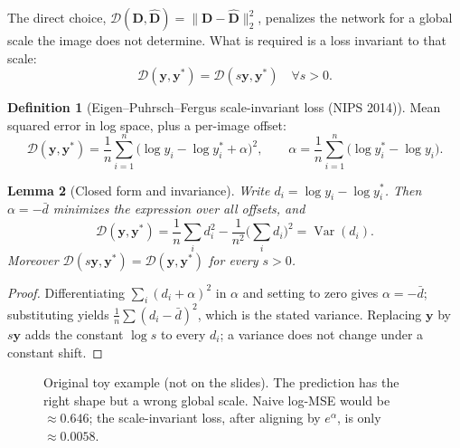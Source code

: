\documentclass[11pt,a4paper]{article}
\theoremstyle{definition}
\newtheorem{definition}{Definition}[section]
\theoremstyle{plain}
\newtheorem{lemma}[definition]{Lemma}
\theoremstyle{remark}
\begin{document}
The direct choice, $\mathcal D(\bm D,\hat{\bm D})=\|\bm D-\hat{\bm D}\|_2^2$, penalizes the network for a global scale the image does not determine. What is required is a loss invariant to that scale:
\[
\mathcal D(\bm y,\bm y^\ast)=\mathcal D(s\bm y,\bm y^\ast)\quad\forall s>0 .
\]
 
\begin{definition}[Eigen--Puhrsch--Fergus scale-invariant loss (NIPS 2014)]
Mean squared error in log space, plus a per-image offset:
\[
\mathcal D(\bm y,\bm y^\ast)=\frac1n\sum_{i=1}^n\big(\log y_i-\log y^\ast_i+\alpha\big)^2,
\qquad
\alpha=\frac1n\sum_{i=1}^n\big(\log y^\ast_i-\log y_i\big).
\]
\end{definition}
 
\begin{lemma}[Closed form and invariance]\label{lem:si}
Write $d_i=\log y_i-\log y^\ast_i$. Then $\alpha=-\bar d$ minimizes the expression over all offsets, and
\[
\mathcal D(\bm y,\bm y^\ast)=\frac1n\sum_i d_i^2-\frac1{n^2}\Big(\sum_i d_i\Big)^2=\operatorname{Var}(d_i).
\]
Moreover $\mathcal D(s\bm y,\bm y^\ast)=\mathcal D(\bm y,\bm y^\ast)$ for every $s>0$.
\end{lemma}
\begin{proof}
Differentiating $\sum_i(d_i+\alpha)^2$ in $\alpha$ and setting to zero gives $\alpha=-\bar d$; substituting yields $\frac1n\sum(d_i-\bar d)^2$, which is the stated variance. Replacing $\bm y$ by $s\bm y$ adds the constant $\log s$ to every $d_i$; a variance does not change under a constant shift. \qedhere
\end{proof}
 
\begin{figure}[htbp]
\centering
{}
\caption{Original toy example (not on the slides). The prediction has the right shape but a wrong global scale. Naive log-MSE would be $\approx0.646$; the scale-invariant loss, after aligning by $e^{\alpha}$, is only $\approx0.0058$.}
\end{figure}
 
\end{document}
